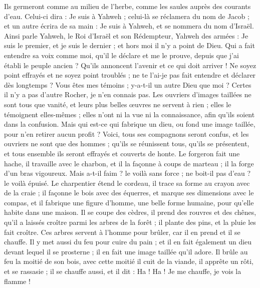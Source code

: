 \begin{multicols}{2}
Ils germeront comme au milieu de l'herbe, comme les saules auprès des courants d'eau.
Celui-ci dira : Je suis à Yahweh ; celui-là se réclamera du nom de Jacob ; et un autre écrira de sa main : Je suis à Yahweh, et se nommera du nom d'Israël.
Ainsi parle Yahweh, le Roi d'Israël et son Rédempteur, Yahweh des armées : Je suis le premier, et je suis le dernier ; et hors moi il n'y a point de Dieu.
Qui a fait entendre sa voix comme moi, qu'il le déclare et me le prouve, depuis que j'ai établi le peuple ancien ? Qu'ils annoncent l'avenir et ce qui doit arriver !
Ne soyez point effrayés et ne soyez point troublés ; ne te l'ai-je pas fait entendre et déclarer dès longtemps ? Vous êtes mes témoins ; y-a-t-il un autre Dieu que moi ? Certes il n'y a pas d'autre Rocher, je n'en connais pas.
Les ouvriers d'images taillées ne sont tous que vanité, et leurs plus belles œuvres ne servent à rien ; elles le témoignent elles-mêmes ; elles n'ont ni la vue ni la connaissance, afin qu'ils soient dans la confusion.
Mais qui est-ce qui fabrique un dieu, ou fond une image taillée, pour n'en retirer aucun profit ?
Voici, tous ses compagnons seront confus, et les ouvriers ne sont que des hommes ; qu'ils se réunissent tous, qu'ils se présentent, et tous ensemble ils seront effrayés et couverts de honte.
Le forgeron fait une hache, il travaille avec le charbon, et il la façonne à coups de marteau ; il la forge d'un bras vigoureux. Mais a-t-il faim ? le voilà sans force ; ne boit-il pas d'eau ? le voilà épuisé.
Le charpentier étend le cordeau, il trace sa forme au crayon avec de la craie ; il façonne le bois avec des équerres, et marque ses dimensions avec le compas, et il fabrique une figure d'homme, une belle forme humaine, pour qu'elle habite dans une maison.
Il se coupe des cèdres, il prend des rouvres et des chênes, qu'il a laissés croître parmi les arbres de la forêt ; il plante des pins, et la pluie les fait croître.
Ces arbres servent à l'homme pour brûler, car il en prend et il se chauffe. Il y met aussi du feu pour cuire du pain ; et il en fait également un dieu devant lequel il se prosterne ; il en fait une image taillée qu'il adore.
Il brûle au feu la moitié de son bois, avec cette moitié il cuit de la viande, il apprête un rôti, et se rassasie ; il se chauffe aussi, et il dit : Ha ! Ha ! Je me chauffe, je vois la flamme !

\end{multicols}
